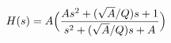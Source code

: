\hsize 0pt
\vsize 0pt
\nopagenumbers
\overfullrule 0pt
\noindent
$$
H(s) =A \Bigl({A s^2 + (\sqrt{A}/Q)s + 1
\over
s^2 + (\sqrt{A}/Q)s + A}\Bigr)
$$
\bye